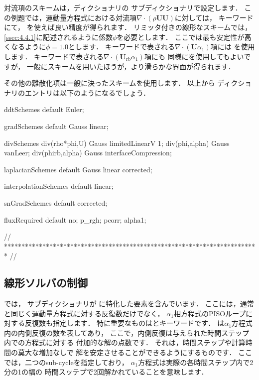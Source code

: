 対流項のスキームは，ディクショナリの
サブディクショナリで設定します．
この例題では，運動量方程式における対流項$\nabla \cdot (\rho\bm{U}\bm{U})$に対しては，
キーワードにて，
を使えば良い精度が得られます．
リミッタ付きの線形なスキームでは，
\autoref{ssec:4.4.1}に記述されるように係数$\phi$を必要とします．
ここでは最も安定性が高くなるように$\phi = 1.0$とします．
キーワードで表される$\nabla \cdot (\bm{U}\alpha_{1})$項には
を使用します．
キーワードで表される$\nabla \cdot (\bm{U}_{\mathrm{rb}}\alpha_{1})$項にも
同様にを使用してもよいですが，
一般にスキームを用いたほうが，より滑らかな界面が得られます．

その他の離散化項は一般に決ったスキームを使用します．
以上から
%
%
ディクショナリのエントリは以下のようになるでしょう．
\begin{OFverbatim}[file, linenum=17]

ddtSchemes
{
    default         Euler;
}

gradSchemes
{
    default         Gauss linear;
}

divSchemes
{
    div(rho*phi,U)  Gauss limitedLinearV 1;
    div(phi,alpha)  Gauss vanLeer;
    div(phirb,alpha) Gauss interfaceCompression;
}

laplacianSchemes
{
    default         Gauss linear corrected;
}

interpolationSchemes
{
    default         linear;
}

snGradSchemes
{
    default         corrected;
}

fluxRequired
{
    default         no;
    p_rgh;
    pcorr;
    alpha1;
}


// ************************************************************************* //
\end{OFverbatim}


\subsection{線形ソルバの制御}
\label{ssec:2.3.7}
では，
サブディクショナリが
に特化した要素を含んでいます．
ここには，通常と同じく運動量方程式に対する反復数だけでなく，
$\alpha_{1}$相方程式のPISOループに対する反復数も指定します．
特に重要なものはとキーワードです．
%
%
は$\alpha_{1}$方程式内の内側反復の数を表してあり，
ここで，内側反復は与えられた時間ステップ内での方程式に対する
付加的な解の点数です．
それは，時間ステップや計算時間の莫大な増加なしで
解を安定させることができるようにするものです．
ここでは，二つのsub-cycleを指定しており，
$\alpha_{1}$方程式は実際の各時間ステップ内で2分の1の幅の
時間スッテプで2回解かれていることを意味します．

